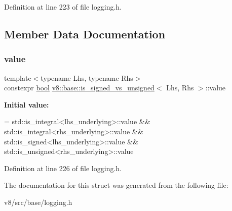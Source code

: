 Definition at line 223 of file logging.\+h.



\subsection{Member Data Documentation}
\mbox{\label{structv8_1_1base_1_1is__signed__vs__unsigned_aaecc8bcf158e63be38530e8050dfa955}} 
\subsubsection{\texorpdfstring{value}{value}}
{\footnotesize\ttfamily template$<$typename Lhs, typename Rhs$>$ \\
constexpr \mbox{\hyperlink{classbool}{bool}} \mbox{\hyperlink{structv8_1_1base_1_1is__signed__vs__unsigned}{v8\+::base\+::is\+\_\+signed\+\_\+vs\+\_\+unsigned}}$<$ Lhs, Rhs $>$\+::value\hspace{0.3cm}{\ttfamily [static]}}

{\bfseries Initial value\+:}
\begin{DoxyCode}
= std::is\_integral<lhs\_underlying>::value &&
                                std::is\_integral<rhs\_underlying>::value &&
                                std::is\_signed<lhs\_underlying>::value &&
                                std::is\_unsigned<rhs\_underlying>::value
\end{DoxyCode}


Definition at line 226 of file logging.\+h.



The documentation for this struct was generated from the following file\+:\begin{DoxyCompactItemize}
\item 
v8/src/base/logging.\+h\end{DoxyCompactItemize}

